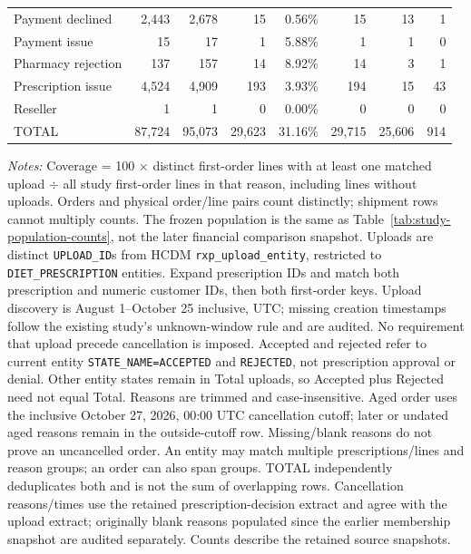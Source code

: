\begin{landscape}
\begin{table}[!htbp]
\begin{tabular}{@{}lrrrrrrr@{}}
{Payment declined} & 2,443 & 2,678 & 15 & 0.56\% & 15 & 13 & 1 \\
{Payment issue} & 15 & 17 & 1 & 5.88\% & 1 & 1 & 0 \\
{Pharmacy rejection} & 137 & 157 & 14 & 8.92\% & 14 & 3 & 1 \\
{Prescription issue} & 4,524 & 4,909 & 193 & 3.93\% & 194 & 15 & 43 \\
{Reseller} & 1 & 1 & 0 & 0.00\% & 0 & 0 & 0 \\
\midrule
{TOTAL} & 87,724 & 95,073 & 29,623 & 31.16\% & 29,715 & 25,606 & 914 \\
\bottomrule
\end{tabular}
\begin{minipage}{\linewidth}
\footnotesize
\textit{Notes:} Coverage = 100 $\times$ distinct first-order lines with at least
one matched upload $\div$ all study first-order lines in that reason, including
lines without uploads. Orders and physical order/line pairs count distinctly;
shipment rows cannot multiply counts. The frozen population is the same as
Table~\ref{tab:study-population-counts}, not the later financial comparison snapshot.
Uploads are distinct \texttt{UPLOAD\_ID}s from HCDM
\texttt{rxp\_upload\_entity}, restricted to \texttt{DIET\_PRESCRIPTION} entities.
Expand prescription IDs and match both prescription and numeric customer IDs,
then both first-order keys. Upload discovery is August 1--October 25 inclusive,
UTC; missing creation timestamps follow the existing study's unknown-window rule
and are audited. No requirement that upload precede cancellation is imposed.
Accepted and rejected refer to current entity \texttt{STATE\_NAME=ACCEPTED} and
\texttt{REJECTED}, not prescription approval or denial. Other entity states
remain in Total uploads, so Accepted plus Rejected need not equal Total.
Reasons are trimmed and case-insensitive. Aged order uses the inclusive
October 27, 2026, 00:00 UTC cancellation cutoff; later or undated aged reasons
remain in the outside-cutoff row. Missing/blank reasons do not prove an uncancelled
order. An entity may match multiple prescriptions/lines and reason groups;
an order can also span groups. TOTAL independently deduplicates both and is not
the sum of overlapping rows. Cancellation reasons/times use the retained
prescription-decision extract and agree with the upload extract; originally blank
reasons populated since the earlier membership snapshot are audited separately.
Counts describe the retained source snapshots.
\end{minipage}
\end{table}
\end{landscape}
\clearpage
